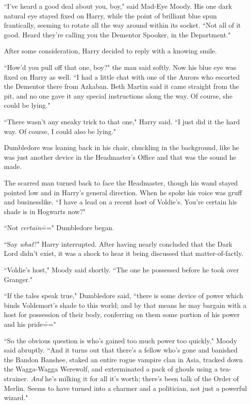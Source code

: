 ``I've heard a good deal about you, boy," said Mad-Eye Moody. His one dark natural eye stayed fixed on Harry, while the point of brilliant blue spun frantically, seeming to rotate all the way around within its socket. ``Not all of it good. Heard they're calling you the Dementor Spooker, in the Department."

After some consideration, Harry decided to reply with a knowing smile.

``How'd you pull off that one, boy?" the man said softly. Now his blue eye was fixed on Harry as well. ``I had a little chat with one of the Aurors who escorted the Dementor there from Azkaban. Beth Martin said it came straight from the pit, and no one gave it any special instructions along the way. Of course, she could be lying."

``There wasn't any sneaky trick to that one," Harry said. ``I just did it the hard way. Of course, I could also be lying."

Dumbledore was leaning back in his chair, chuckling in the background, like he was just another device in the Headmaster's Office and that was the sound he made.

The scarred man turned back to face the Headmaster, though his wand stayed pointed low and in Harry's general direction. When he spoke his voice was gruff and businesslike. ``I have a lead on a recent host of Voldie's. You're certain his shade is in Hogwarts now?"

``Not \emph{certain}\===" Dumbledore began.

``Say \emph{what}?" Harry interrupted. After having nearly concluded that the Dark Lord didn't exist, it was a shock to hear it being discussed that matter-of-factly.

``Voldie's host," Moody said shortly. ``The one he possessed before he took over Granger."

``If the tales speak true," Dumbledore said, ``there is some device of power which binds Voldemort's shade to this world; and by that means he may bargain with a host for possession of their body, conferring on them some portion of his power and his pride\==="

``So the obvious question is who's gained too much power too quickly," Moody said abruptly. ``And it turns out that there's a fellow who's gone and banished the Bandon Banshee, staked an entire rogue vampire clan in Asia, tracked down the Wagga-Wagga Werewolf, and exterminated a pack of ghouls using a tea-strainer. \emph{And} he's milking it for all it's worth; there's been talk of the Order of Merlin. Seems to have turned into a charmer and a politician, not just a powerful wizard."

